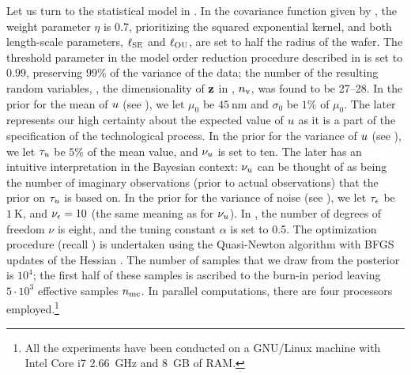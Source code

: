 Let us turn to the statistical model in . In the covariance function given by , the weight parameter $\eta$ is 0.7, prioritizing the squared exponential kernel, and both length-scale parameters, $\ell_{\text{SE}}$ and $\ell_{\text{OU}}$, are set to half the radius of the wafer. The threshold parameter in the model order reduction procedure described in  is set to $0.99$, preserving $99\%$ of the variance of the data; the number of the resulting random variables, \ie, the dimensionality of $\mathbf{z}$ in , ${n_\text{v}}$, was found to be 27--28.
In the prior for the mean of $u$ (see ), we let $\mu_0$ be $45~\text{nm}$ and $\sigma_0$ be $1\%$ of $\mu_0$. The later represents our high certainty about the expected value of $u$ as it is a part of the specification of the technological process.
In the prior for the variance of $u$ (see ), we let $\tau_u$ be $5\%$ of the mean value, and $\nu_u$ is set to ten. The later has an intuitive interpretation in the Bayesian context: $\nu_u$ can be thought of as being the number of imaginary observations (prior to actual observations) that the prior on $\tau_u$ is based on.
In the prior for the variance of noise (see ), we let $\tau_\epsilon$ be $1~\text{K}$, and $\nu_\epsilon = 10$ (the same meaning as for $\nu_u$).
In , the number of degrees of freedom $\nu$ is eight, and the tuning constant $\alpha$ is set to 0.5.
The optimization procedure (recall ) is undertaken using the Quasi-Newton algorithm with BFGS updates of the Hessian \cite{press2007}.
The number of samples that we draw from the posterior is $10^4$; the first half of these samples is ascribed to the burn-in period leaving $5 \cdot 10^3$ effective samples ${n_\text{mc}}$.
In parallel computations, there are four processors employed.\footnote{All the experiments have been conducted on a GNU/Linux machine with Intel Core i7 2.66~GHz and 8~GB of RAM.}

